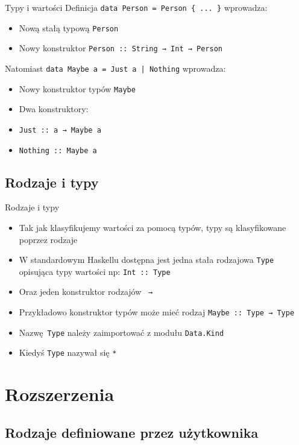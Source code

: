 \documentclass{beamer}
\begin{document}
\begin{frame}[fragile]{Typy i wartości}
  Definicja \lstinline!data Person = Person { ... }! wprowadza:
  \begin{itemize}
    \item Nową stałą typową \lstinline!Person!
    \item Nowy konstruktor \lstinline!Person :: String → Int → Person!
  \end{itemize}
  \vspace{1em}
  Natomiast \lstinline!data Maybe a = Just a | Nothing! wprowadza:
  \begin{itemize}
    \item Nowy konstruktor typów \lstinline!Maybe!
    \item Dwa konstruktory:
    \item \lstinline!Just :: a → Maybe a!
    \item \lstinline!Nothing :: Maybe a!
  \end{itemize}
\end{frame}

\subsection{Rodzaje i typy}
\begin{frame}[fragile]{Rodzaje i typy}
  \begin{itemize}
    \item Tak jak klasyfikujemy wartości za pomocą typów, typy są klasyfikowane poprzez rodzaje
    \item W standardowym Haskellu dostępna jest jedna stała rodzajowa \lstinline!Type! opisująca typy wartości np: \lstinline!Int :: Type!
    \item Oraz jeden konstruktor rodzajów \lstinline{ →}
    \item Przykładowo konstruktor typów może mieć rodzaj \lstinline!Maybe :: Type → Type!
    \item Nazwę \lstinline{Type} należy zaimportować z modułu \lstinline{Data.Kind}
    \item Kiedyś \lstinline{Type} nazywał się \lstinline{*}
  \end{itemize}
\end{frame}

\section{Rozszerzenia}

\subsection{Rodzaje definiowane przez użytkownika}
\end{document}
